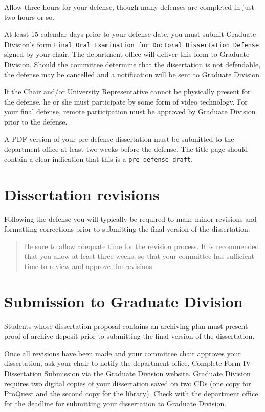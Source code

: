 \documentclass[
]{book}
\begin{document}
Allow three hours for your defense, though many defenses are completed in just two hours or so.

At least 15 calendar days prior to your defense date, you must submit Graduate Division's form \texttt{Final\ Oral\ Examination\ for\ Doctoral\ Dissertation\ Defense}, signed by your chair. The department office will deliver this form to Graduate Division. Should the committee determine that the dissertation is not defendable, the defense may be cancelled and a notification will be sent to Graduate Division.

If the Chair and/or University Representative cannot be physically present for the defense, he or she must participate by some form of video technology. For your final defense, remote participation must be approved by Graduate Division prior to the defense.

A PDF version of your pre-defense dissertation must be submitted to the department office at least two weeks before the defense. The title page should contain a clear indication that this is a \texttt{pre-defense\ draft}.

\hypertarget{dissertation-revisions}{%
\section{Dissertation revisions}\label{dissertation-revisions}}

Following the defense you will typically be required to make minor revisions and formatting corrections prior to submitting the final version of the dissertation.

\begin{quote}
Be sure to allow adequate time for the revision process. It is recommended that you allow at least three weeks, so that your committee has sufficient time to review and approve the revisions.
\end{quote}

\hypertarget{submission-to-graduate-division}{%
\section{Submission to Graduate Division}\label{submission-to-graduate-division}}

Students whose dissertation proposal contains an \protect\hypertarget{archiving}{}{archiving plan} must present proof of archive deposit prior to submitting the final version of the dissertation.

Once all revisions have been made and your committee chair approves your dissertation, ask your chair to notify the department office. Complete Form IV-Dissertation Submission via the \href{https://manoa.hawaii.edu/graduate/forms/}{Graduate Division website}. Graduate Division requires two digital copies of your dissertation saved on two CDs (one copy for ProQuest and the second copy for the library). Check with the department office for the deadline for submitting your dissertation to Graduate Division.
\end{document}
